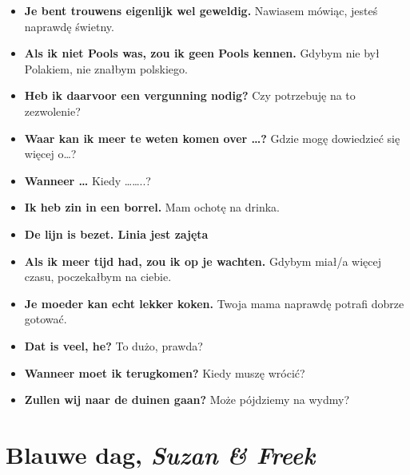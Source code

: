 \documentclass[
]{book}
\providecommand{\tightlist}{%
  \setlength{\itemsep}{0pt}\setlength{\parskip}{0pt}}
\begin{document}
\begin{itemize}
\tightlist
\item
  \textbf{Je bent trouwens eigenlijk wel geweldig.} Nawiasem mówiąc, jesteś naprawdę świetny.\\
\item
  \textbf{Als ik niet Pools was, zou ik geen Pools kennen.} Gdybym nie był Polakiem, nie znałbym polskiego.\\
\item
  \textbf{Heb ik daarvoor een vergunning nodig?} Czy potrzebuję na to zezwolenie?\\
\item
  \textbf{Waar kan ik meer te weten komen over \ldots?} Gdzie mogę dowiedzieć się więcej o\ldots?\\
\item
  \textbf{Wanneer \ldots{}} Kiedy \ldots\ldots..?\\
\item
  \textbf{Ik heb zin in een borrel.} Mam ochotę na drinka.\\
\item
  \textbf{De lijn is bezet. Linia jest zajęta}\\
\item
  \textbf{Als ik meer tijd had, zou ik op je wachten.} Gdybym miał/a więcej czasu, poczekałbym na ciebie.\\
\item
  \textbf{Je moeder kan echt lekker koken.} Twoja mama naprawdę potrafi dobrze gotować.\\
\item
  \textbf{Dat is veel, he?} To dużo, prawda?\\
\item
  \textbf{Wanneer moet ik terugkomen?} Kiedy muszę wrócić?\\
\item
  \textbf{Zullen wij naar de duinen gaan?} Może pójdziemy na wydmy?
\end{itemize}

\hypertarget{Blauwe-dag}{%
\section{\texorpdfstring{Blauwe dag, \emph{Suzan \& Freek}}{Blauwe dag, Suzan \& Freek}}\label{Blauwe-dag}}
\end{document}
